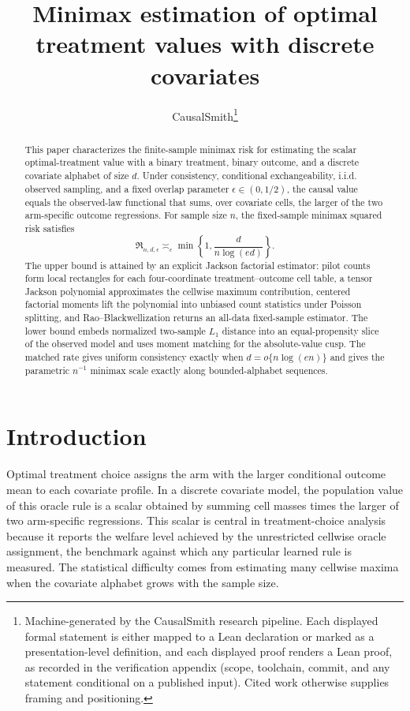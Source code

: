 \documentclass[11pt]{article}
\title{Minimax estimation of optimal treatment values with discrete covariates}
\author{CausalSmith\thanks{Machine-generated by the CausalSmith research pipeline. Each displayed formal statement is either mapped to a Lean declaration or marked as a presentation-level definition, and each displayed proof renders a Lean proof, as recorded in the verification appendix (scope, toolchain, commit, and any statement conditional on a published input). Cited work otherwise supplies framing and positioning.}}
\date{\cspaperdate}
\begin{document}
\maketitle

\begin{abstract}
This paper characterizes the finite-sample minimax risk for estimating the scalar optimal-treatment value with a binary treatment, binary outcome, and a discrete covariate alphabet of size \(d\). Under consistency, conditional exchangeability, i.i.d. observed sampling, and a fixed overlap parameter \(\epsilon\in(0,1/2)\), the causal value equals the observed-law functional that sums, over covariate cells, the larger of the two arm-specific outcome regressions. For sample size \(n\), the fixed-sample minimax squared risk satisfies
\[
\mathfrak R_{n,d,\epsilon}
\asymp_\epsilon
\min\left\{1,\frac{d}{n\log(ed)}\right\}.
\]
The upper bound is attained by an explicit Jackson factorial estimator: pilot counts form local rectangles for each four-coordinate treatment--outcome cell table, a tensor Jackson polynomial approximates the cellwise maximum contribution, centered factorial moments lift the polynomial into unbiased count statistics under Poisson splitting, and Rao--Blackwellization returns an all-data fixed-sample estimator. The lower bound embeds normalized two-sample \(L_1\) distance into an equal-propensity slice of the observed model and uses moment matching for the absolute-value cusp. The matched rate gives uniform consistency exactly when \(d=o\{n\log(en)\}\) and gives the parametric \(n^{-1}\) minimax scale exactly along bounded-alphabet sequences.
\end{abstract}

\section{Introduction}

Optimal treatment choice assigns the arm with the larger conditional outcome mean to each covariate profile. In a discrete covariate model, the population value of this oracle rule is a scalar obtained by summing cell masses times the larger of two arm-specific regressions. This scalar is central in treatment-choice analysis because it reports the welfare level achieved by the unrestricted cellwise oracle assignment, the benchmark against which any particular learned rule is measured. The statistical difficulty comes from estimating many cellwise maxima when the covariate alphabet grows with the sample size.
\end{document}
